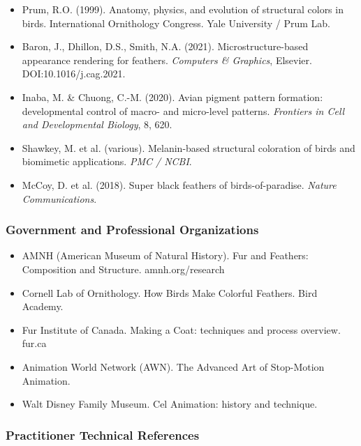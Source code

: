 \documentclass[11pt,letterpaper]{article}
\begin{document}
\begin{itemize}[noitemsep]
  \item Prum, R.O. (1999). Anatomy, physics, and evolution of structural colors in birds. International Ornithology Congress. Yale University / Prum Lab.
  \item Baron, J., Dhillon, D.S., Smith, N.A. (2021). Microstructure-based appearance rendering for feathers. \textit{Computers \& Graphics}, Elsevier. DOI:10.1016/j.cag.2021.
  \item Inaba, M. \& Chuong, C.-M. (2020). Avian pigment pattern formation: developmental control of macro- and micro-level patterns. \textit{Frontiers in Cell and Developmental Biology}, 8, 620.
  \item Shawkey, M. et al. (various). Melanin-based structural coloration of birds and biomimetic applications. \textit{PMC / NCBI}.
  \item McCoy, D. et al. (2018). Super black feathers of birds-of-paradise. \textit{Nature Communications}.
\end{itemize}

\subsubsection{Government and Professional Organizations}

\begin{itemize}[noitemsep]
  \item AMNH (American Museum of Natural History). Fur and Feathers: Composition and Structure. amnh.org/research
  \item Cornell Lab of Ornithology. How Birds Make Colorful Feathers. Bird Academy.
  \item Fur Institute of Canada. Making a Coat: techniques and process overview. fur.ca
  \item Animation World Network (AWN). The Advanced Art of Stop-Motion Animation.
  \item Walt Disney Family Museum. Cel Animation: history and technique.
\end{itemize}

\subsubsection{Practitioner Technical References}
\end{document}
